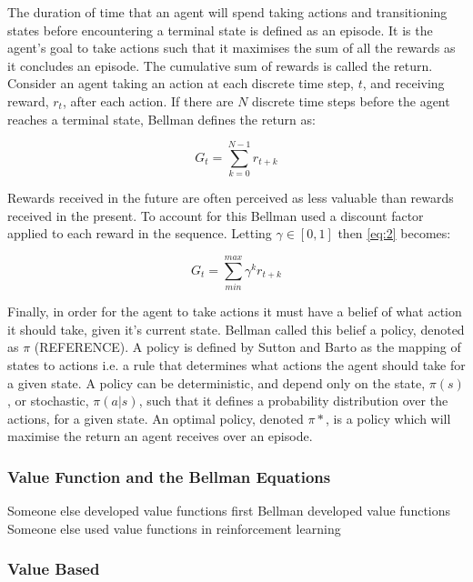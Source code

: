 The duration of time that an agent will spend taking actions and transitioning states before encountering a terminal state is defined as an episode. It is the agent's goal to take actions such that it maximises the sum of all the rewards as it concludes an episode. The cumulative sum of rewards is called the return. Consider an agent taking an action at each discrete time step, $t$, and receiving reward, $r_t$, after each action. If there are $N$ discrete time steps before the agent reaches a terminal state, Bellman defines the return as:

\begin{equation}
	G_t = \sum_{k = 0}^{N-1} r_{t + k} \label{eq:2}
\end{equation}

Rewards received in the future are often perceived as less valuable than rewards received in the present. To account for this Bellman used a discount factor applied to each reward in the sequence. Letting $\gamma \in [0,1]$ then \ref{eq:2} becomes:

\begin{equation}
	G_t = \sum_{min}^{max}\gamma^k r_{t+k} \label{eq:3}
\end{equation}

Finally, in order for the agent to take actions it must have a belief of what action it should take, given it's current state. Bellman called this belief a policy, denoted as $\pi$ (REFERENCE). A policy is defined by Sutton and Barto as the mapping of states to actions i.e. a rule that determines what actions the agent should take for a given state. A policy can be deterministic, and depend only on the state, $\pi(s)$, or stochastic, $\pi(a|s)$, such that it defines a probability distribution over the actions, for a given state. An optimal policy, denoted $\pi*$, is a policy which will
maximise the return an agent receives over an episode.

\subsubsection{Value Function and the Bellman Equations}
Someone else developed value functions first
Bellman developed value functions
Someone else used value functions in reinforcement learning


\subsubsection{Value Based}

